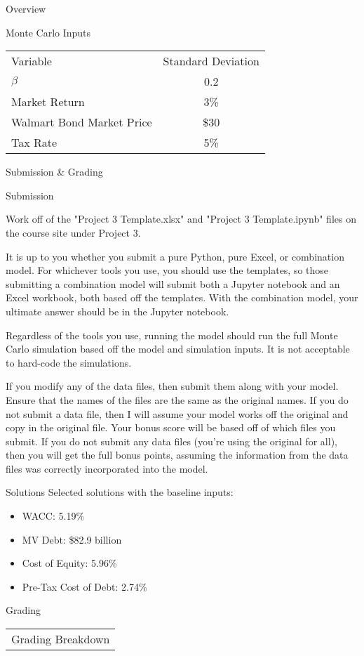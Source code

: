 \documentclass[]{article}
\begin{document}
\begin{section}{Overview}
\begin{subsection}{Monte Carlo Inputs}
\begin{center}
\begin{tabular}{l|c}
\toprule
Variable & Standard Deviation\\

\cmidrule(lr){1-2}
$\beta$ & 0.2\\
Market Return & 3\%\\
Walmart Bond Market Price & \$30\\
Tax Rate & 5\%\\

\bottomrule
\end{tabular}
\end{center}
\label{mc-inputs}
\end{subsection}
\end{section}
\begin{section}{Submission \& Grading}
\begin{subsection}{Submission}

Work off of the "Project 3 Template.xlsx" and "Project 3 Template.ipynb" files on the course site under Project 3.

It is up to you whether you submit a pure Python, pure Excel, or combination model. For whichever tools
you use, you should use the templates, so those submitting a combination model will submit both a Jupyter notebook
and an Excel workbook, both based off the templates. With the combination model, your ultimate answer should be
in the Jupyter notebook.

Regardless of the tools you use, running the model should run the full Monte Carlo simulation based off the
model and simulation inputs. It is not acceptable to hard-code the simulations.

If you modify any of the data files, then submit them along with your model. Ensure that the names of
the files are the same as the original names. If you do not submit a data file, then I will assume your model
works off the original and copy in the original file. Your bonus score will be based off of which files you submit.
If you do not submit any data files (you're using the original for all), then you will get the full bonus points,
assuming the information from the data files was correctly incorporated into the model.

\end{subsection}
\begin{subsection}{Solutions}
Selected solutions with the baseline inputs:
\begin{itemize}
\item WACC: 5.19\%
\item MV Debt: \$82.9 billion
\item Cost of Equity: 5.96\%
\item Pre-Tax Cost of Debt: 2.74\%
\end{itemize}
\end{subsection}
\begin{subsection}{Grading}
\begin{center}
\begin{tabular}{l|c}
\multicolumn{2}{c}{Grading Breakdown}\\


\end{tabular}
\end{center}
\end{subsection}
\end{section}
\end{document}
